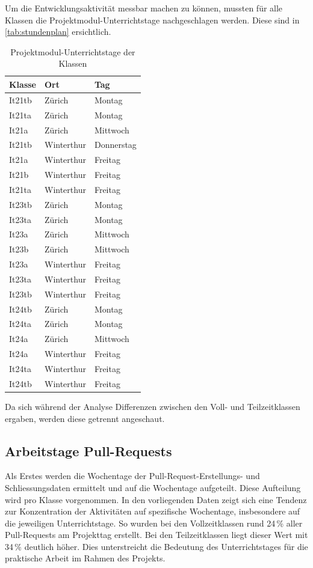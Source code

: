 Um die Entwicklungsaktivität messbar machen zu können, mussten für alle Klassen die Projektmodul-Unterrichtstage nachgeschlagen werden. Diese sind in \autoref{tab:stundenplan} ersichtlich. 
\begin{table}[ht]
\caption{Projektmodul-Unterrichtstage der Klassen}
\label{tab:stundenplan}
\centering
\begin{tabular}{l l l}
\toprule
\textbf{Klasse} & \textbf{Ort} & \textbf{Tag} \\
\midrule
It21tb   & Zürich      & Montag      \\
It21ta   & Zürich      & Montag      \\
It21a    & Zürich      & Mittwoch    \\
It21tb   & Winterthur  & Donnerstag  \\
It21a    & Winterthur  & Freitag     \\
It21b    & Winterthur  & Freitag     \\
It21ta   & Winterthur  & Freitag     \\
\midrule
It23tb   & Zürich      & Montag      \\
It23ta   & Zürich      & Montag      \\
It23a    & Zürich      & Mittwoch    \\
It23b    & Zürich      & Mittwoch    \\
It23a    & Winterthur  & Freitag     \\
It23ta   & Winterthur  & Freitag     \\
It23tb   & Winterthur  & Freitag     \\
\midrule
It24tb   & Zürich      & Montag      \\
It24ta   & Zürich      & Montag      \\
It24a    & Zürich      & Mittwoch    \\
It24a    & Winterthur  & Freitag     \\
It24ta   & Winterthur  & Freitag     \\
It24tb   & Winterthur  & Freitag     \\
\bottomrule
\end{tabular}
\end{table}


Da sich während der Analyse  Differenzen zwischen den Voll- und Teilzeitklassen ergaben, werden diese getrennt angeschaut. 

\subsection{Arbeitstage Pull-Requests}
Als Erstes werden die Wochentage der Pull-Request-Erstellungs- und Schliessungsdaten ermittelt und auf die Wochentage aufgeteilt. Diese Aufteilung wird pro Klasse vorgenommen. In den vorliegenden Daten zeigt sich eine Tendenz zur Konzentration der Aktivitäten auf spezifische Wochentage, insbesondere auf die jeweiligen Unterrichtstage. So wurden bei den Vollzeitklassen rund 24\,\% aller Pull-Requests am Projekttag erstellt. Bei den Teilzeitklassen liegt dieser Wert mit 34\,\% deutlich höher. Dies unterstreicht die Bedeutung des Unterrichtstages für die praktische Arbeit im Rahmen des Projekts.

